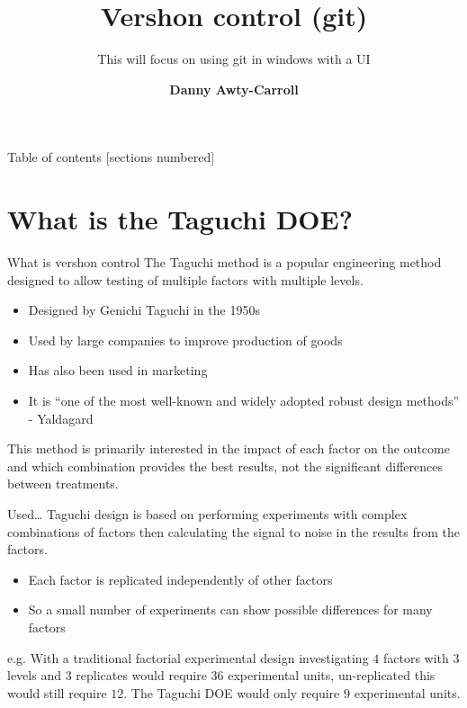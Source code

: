 \documentclass[10pt]{beamer}
\title{Vershon control (git)}
\subtitle{This will focus on using git in windows with a UI}
\author{\textbf{Danny Awty-Carroll}}
\institute{\tiny{\date{\today}}}
\begin{document}
\maketitle



\begin{frame}{Table of contents}
  [sections numbered]
  \tableofcontents[hideallsubsections]
\end{frame}



\section{What is the Taguchi DOE?}



{%
\begin{frame}[fragile]{What is vershon control}
The Taguchi method is a popular engineering method designed to allow testing of multiple factors with multiple levels.
	\begin{itemize}
		\item Designed by Genichi Taguchi in the 1950s
		\item Used by large companies to improve production of goods
		\item Has also been used in marketing
		\item It is ``one of the most well-known and widely adopted robust design methods'' - \small{Yaldagard}
	\end{itemize}

This method is primarily interested in the impact of each factor on the outcome and which combination provides the best results, not the significant differences between treatments.
\end{frame}
}


\begin{frame}[fragile]{Used\dots}
Taguchi design is based on performing experiments with complex combinations of factors then calculating the signal to noise in the results from the factors.
	
	\begin{itemize}
		\item Each factor is replicated independently of other factors
		\item So a small number of experiments can show possible differences for many factors
	\end{itemize}

e.g. With a traditional factorial experimental design investigating $4$ factors with $3$ levels and $3$ replicates would require $36$ experimental units, un-replicated this would still require $12$. The Taguchi DOE would only require $9$ experimental units.
\end{frame}
\end{document}
